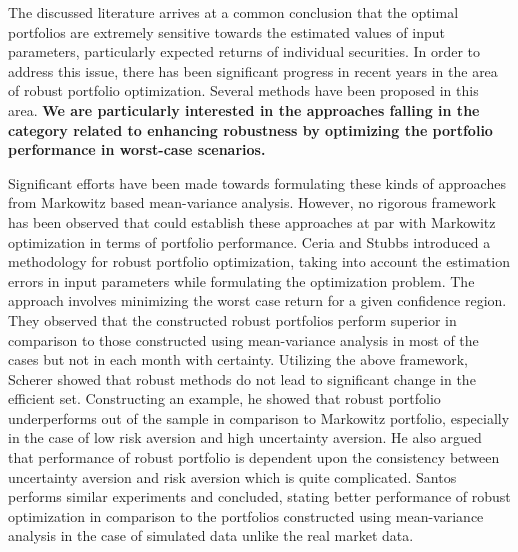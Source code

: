 The discussed literature arrives at a common conclusion that the optimal portfolios are extremely sensitive towards the estimated values of input parameters, particularly expected returns of individual securities. In order to address this issue, there has been significant progress in recent years in the area of robust portfolio optimization. Several methods have been proposed in this area. \textbf{We are particularly interested in the approaches falling in the category related to enhancing robustness by optimizing the portfolio performance in worst-case scenarios.} 

Significant efforts have been made towards formulating these kinds of approaches from Markowitz based mean-variance analysis. However, no rigorous framework has been observed that could establish these approaches at par with Markowitz optimization in terms of portfolio performance. Ceria and Stubbs \cite{Ceria} introduced a methodology for robust portfolio optimization, taking into account the estimation errors in input parameters while formulating the optimization problem. The approach involves minimizing the worst case return for a given confidence region. They observed that the constructed robust portfolios perform superior in comparison to those constructed using mean-variance analysis in most of the cases but not in each month with certainty. Utilizing the above framework, Scherer \cite{Scherer} showed that robust methods do not lead to significant change in the efficient set. Constructing an example, he showed that robust portfolio underperforms out of the sample in comparison to Markowitz portfolio, especially in the case of low risk aversion and high uncertainty aversion. He also argued that performance of robust portfolio is dependent upon the consistency between uncertainty aversion and risk aversion which is quite complicated. Santos \cite{santos} performs similar experiments and concluded, stating better performance of robust optimization in comparison to the portfolios constructed using mean-variance analysis in the case of simulated data unlike the real market data.

